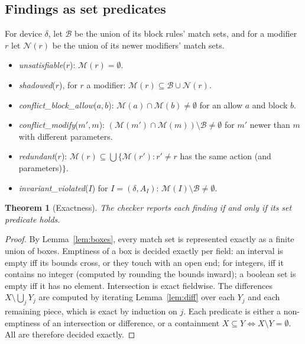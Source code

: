 \documentclass[conference]{IEEEtran}
\newtheorem{theorem}{Theorem}
\theoremstyle{definition}
\newcommand{\M}{\mathcal{M}}
\begin{document}
\subsection{Findings as set predicates}
For device $\delta$, let $\mathcal B$ be the union of its block rules' match sets, and for a modifier $r$ let $\mathcal N(r)$ be the union of its newer modifiers' match sets.
\begin{itemize}
\item \emph{unsatisfiable}($r$): $\M(r)=\emptyset$.
\item \emph{shadowed}($r$), for $r$ a modifier: $\M(r)\subseteq\mathcal B\cup\mathcal N(r)$.
\item \emph{conflict\_block\_allow}($a,b$): $\M(a)\cap\M(b)\ne\emptyset$ for an allow $a$ and block $b$.
\item \emph{conflict\_modify}($m',m$): $(\M(m')\cap\M(m))\setminus\mathcal B\ne\emptyset$ for $m'$ newer than $m$ with different parameters.
\item \emph{redundant}($r$): $\M(r)\subseteq\bigcup\{\M(r'):r'\ne r$ has the same action (and parameters)$\}$.
\item \emph{invariant\_violated}($I$) for $I=(\delta,A_I)$: $\M(I)\setminus\mathcal B\neq\emptyset$.
\end{itemize}

\begin{theorem}[Exactness]\label{thm:exact}
The checker reports each finding if and only if its set predicate holds.
\end{theorem}
\begin{proof}
By Lemma~\ref{lem:boxes}, every match set is represented exactly as a finite union of boxes. Emptiness of a box is decided exactly per field: an interval is empty iff its bounds cross, or they touch with an open end; for integers, iff it contains no integer (computed by rounding the bounds inward); a boolean set is empty iff it has no element. Intersection is exact fieldwise. The differences $X\setminus\bigcup_j Y_j$ are computed by iterating Lemma~\ref{lem:diff} over each $Y_j$ and each remaining piece, which is exact by induction on $j$. Each predicate is either a non-emptiness of an intersection or difference, or a containment $X\subseteq Y\iff X\setminus Y=\emptyset$. All are therefore decided exactly.
\end{proof}
\end{document}
